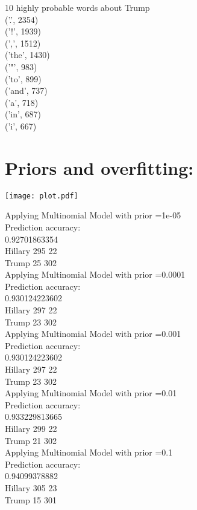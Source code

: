 \documentclass[]{article}
\begin{document}
\begin{enumerate}
		 10 highly probable words about Trump\\
		 ('.', 2354)\\
		 ('!', 1939)\\
		 (',', 1512)\\
		 ('the', 1430)\\
		 ('"', 983)\\
		 ('to', 899)\\
		 ('and', 737)\\
		 ('a', 718)\\
		 ('in', 687)\\
		 ('i', 667)
\end{enumerate}

\section{Priors and overfitting:}

\texttt{[image: plot.pdf]}



Applying Multinomial Model with prior =1e-05\\
Prediction accuracy:\\
0.92701863354\\
Hillary     295 22\\
Trump       25 302\\

Applying Multinomial Model with prior =0.0001\\
Prediction accuracy:\\
0.930124223602\\
Hillary     297 22\\
Trump       23 302\\

Applying Multinomial Model with prior =0.001\\
Prediction accuracy:\\
0.930124223602\\
Hillary     297 22\\
Trump       23 302\\

Applying Multinomial Model with prior =0.01\\
Prediction accuracy:\\
0.933229813665\\
Hillary     299 22\\
Trump       21 302\\

Applying Multinomial Model with prior =0.1\\
Prediction accuracy:\\
0.94099378882\\
Hillary     305 23\\
Trump       15 301\\
\end{document}
